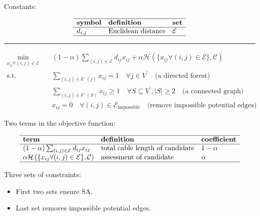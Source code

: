 \documentclass[
]{book}
\providecommand{\tightlist}{%
  \setlength{\itemsep}{0pt}\setlength{\parskip}{0pt}}
\begin{document}
Constants:

\[
\begin{array}{lll}
  \hline
  \textbf{symbol} & \textbf{definition} & \textbf{set} \\
  \hline
  d_{i, j} & \text{Euclidean distance}
  & \mathcal{E} \\
  \hline
\end{array}
\]

\begin{center}\rule{0.5\linewidth}{0.5pt}\end{center}

\[
\begin{aligned}
  \min_{x_{i j} \forall (i, j) \in \mathcal{E}} \quad
    & (1 - \alpha) \sum_{(i, j) \in \mathcal{E}} d_{i j} x_{i j}
    + \alpha \mathcal{H}
    \left(\{x_{i j} \forall (i, j) \in \mathcal{E} \}, \mathcal{C} \right) \\
  \text{s.t.} \quad & \sum_{(i, j) \in \delta^{-}(j)} x_{i j} = 1
    \quad \forall j \in V^{\prime}
    \quad \text{(a directed forest)} \\
  & \sum_{(i, j) \in \delta^{-}(S)} x_{i j} \geq 1
    \quad \forall S \subseteq V^{\prime},|S| \geq 2
    \quad \text{(a connected graph)} \\
  & x_{i j} = 0
    \quad \forall (i, j) \in \mathcal{E}_\text{impossible}
    \quad \text{(remove impossible potential edges)}
\end{aligned}
\]

Two terms in the objective function:

\[
\begin{array}{lll}
  \hline
  \textbf{term} & \textbf{definition} & \textbf{coefficient} \\
  \hline
  (1 - \alpha) \sum_{(i, j) \in \mathcal{E}} d_{i j} x_{i j}
  & \text{total cable length of candidate}
  & 1 - \alpha \\
  \alpha \mathcal{H}
  \left(\{x_{i j} \forall (i, j) \in \mathcal{E} \}, \mathcal{C} \right)
  & \text{assessment of candidate}
  & \alpha \\
  \hline
\end{array}
\]

Three sets of constraints:

\begin{itemize}
\tightlist
\item
  First two sets ensure SA. \citep{fischetti1997branch}
\item
  Last set removes impossible potential edges.
\end{itemize}
\end{document}
